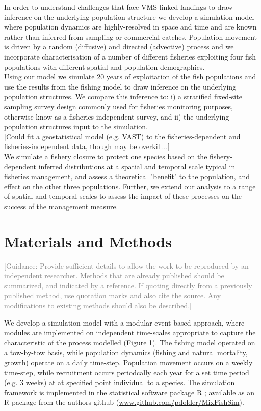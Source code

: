 \documentclass[review]{elsarticle}
\begin{document}
In order to understand challenges that face VMS-linked landings to draw
inference on the underlying population structure we develop a simulation model
where population dynamics are highly-resolved in space and time and are known
rather than inferred from sampling or commercial catches. Population movement
is driven by a random (diffusive) and directed (advective) process and we
incorporate characterisation of a number of different fisheries exploiting four
fish populations with different spatial and population demographics.\\

Using our model we simulate 20 years of exploitation of the fish populations
and use the results from the fishing model to draw inference on the underlying
population structures.  We compare this inference to: i) a stratified
fixed-site sampling survey design commonly used for fisheries monitoring
purposes, otherwise know as a fisheries-independent
	survey, and ii) the underlying population structures input to the
simulation.\\

[Could fit a geostatistical model (e.g. VAST) to the fisheries-dependent and
fisheries-independent data, though may be overkill...] \\

We simulate a fishery closure to protect one species based on the
fishery-dependent inferred distributions at a spatial and temporal scale
typical in fisheries management, and assess a theoretical "benefit" to the
population, and effect on the other three populations. Further, we extend our
analysis to a range of spatial and temporal scales to assess the impact of
these processes on the success of the management measure. \\

\section{Materials and Methods}

\textcolor{gray}{[Guidance: Provide sufficient details to allow the work to be
reproduced by an independent researcher. Methods that are already published
should be summarized, and indicated by a reference.  If quoting directly from a
previously published method, use quotation marks and also cite the source. Any
modifications to existing methods should also be described.] \\ }

We develop a simulation model with a modular event-based approach, where
modules are implemented on independent time-scales appropriate to capture the
characteristic of the process modelled (Figure 1). The fishing model operated on a
tow-by-tow basis, while population dynamics (fishing and natural mortality,
growth) operate on a daily time-step.  Population movement occurs on a
weekly time-step, while recruitment occurs periodcally each year for a set
time period (e.g. 3 weeks) at at specified point individual to a species. The
simulation framework is implemented in the statistical software package R
\cite{RCoreTeam2017}; available as an R package from the authors github
(\url{www.github.com/pdolder/MixFishSim}).\\
\end{document}
